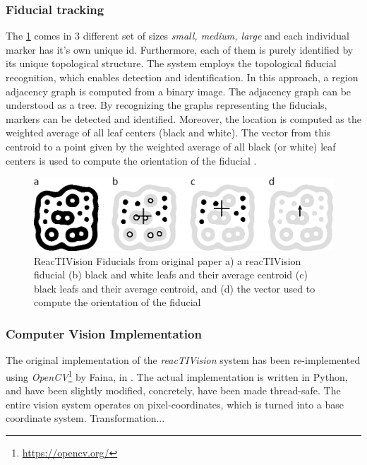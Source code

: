 \subsubsection{Fiducial tracking}

The  \ref{fig:fiducial_markers} comes in 3 different set of sizes \emph{small, medium, large} and each individual marker has it's own unique id. Furthermore, each of them is purely identified by its unique topological structure. The system employs the topological fiducial recognition, which enables detection and identification. In this approach, a region adjacency graph is computed from a binary image. The adjacency graph can be understood as a tree. By recognizing the graphs representing the fiducials, markers can be detected and identified. Moreover, the location is computed as the weighted average of all leaf centers (black and white). The vector from this centroid to a point given by the weighted average of all black (or white) leaf centers is used to compute the orientation of the fiducial \cite{bencina2005improved}.

\begin{figure}[H]
  \centering
  \includegraphics[width=0.66\linewidth]{include/images/fiducial_markers.PNG}
  \caption{ReacTIVision Fiducials from original paper a) a reacTIVision fiducial (b) black and white leafs and their average centroid (c) black leafs and their average centroid, and (d) the vector used to compute the orientation of the fiducial}
  \label{fig:fiducial_markers}
\end{figure}

\subsubsection{Computer Vision Implementation}

The original implementation of the \emph{reacTIVision} system has been re-implemented using \emph{OpenCV}\footnote{\url{https://opencv.org/}} by Faina, in \cite{faina2017automating}. The actual implementation is written in Python, and have been slightly modified, concretely, have been made thread-safe. The entire vision system operates on pixel-coordinates, which is turned into a base coordinate system. Transformation...

